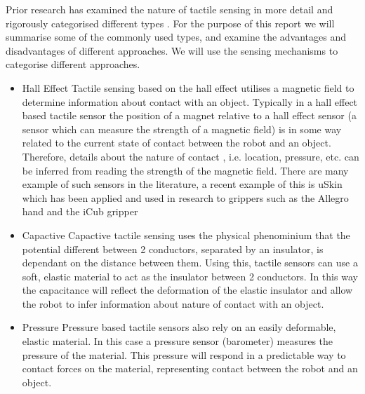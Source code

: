 Prior research has examined the nature of tactile sensing in more detail and rigorously categorised different types \cite{HumanstoHumanoids,TSdexterous}. For the purpose of this report we will summarise some of the commonly used types, and examine the advantages and disadvantages of different approaches. We will use the sensing mechanisms to categorise different approaches.


\begin{itemize}
    \item Hall Effect
    Tactile sensing based on the hall effect utilises a magnetic field to determine information about contact with an object. Typically in a hall effect based tactile sensor the position of a magnet relative to a hall effect sensor (a sensor which can measure the strength of a magnetic field) is in some way related to the current state of contact between the robot and an object. Therefore, details about the nature of contact , i.e. location, pressure, etc. can be inferred from reading the strength of the magnetic field. There are many example of such sensors in the literature, a recent example of this is uSkin \cite{uSkinFingertip} which has been applied and used in research to grippers such as the Allegro hand \cite{Allegro} and the iCub gripper \cite{iCub}
    \item Capactive
    Capactive tactile sensing uses the physical phenominium that the potential different between 2 conductors, separated by an insulator, is dependant on the distance between them. Using this, tactile sensors can use a soft, elastic material to act as the insulator between 2 conductors. In this way the capacitance will reflect the deformation of the elastic insulator and allow the robot to infer information about nature of contact with an object. 
    \item Pressure
    Pressure based tactile sensors also rely on an easily deformable, elastic material. In this case a pressure sensor (barometer) measures the pressure of the material. This pressure will respond in a predictable way to contact forces on the material, representing contact between the robot and an object.
\end{itemize}


